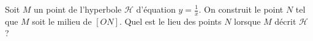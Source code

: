 
Soit $M$ un point de l'hyperbole $\mathscr{H}$ d'équation $y=\frac{1}{x}$. On construit le point $N$ tel que $M$ soit le milieu de $[ON]$. Quel est le lieu des points $N$ lorsque $M$ décrit $\mathscr{H}$ ? 